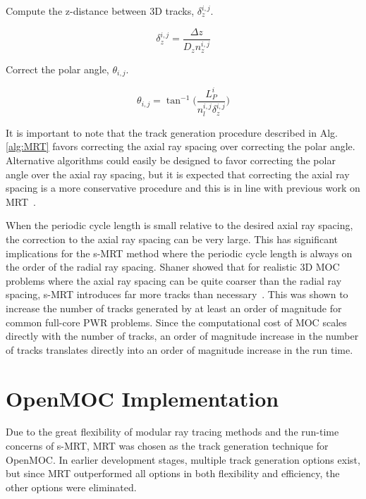 \begin{algorithm*}[!h]
\begin{algorithmic}
		\State Compute the z-distance between 3D tracks, $\delta_z^{i,j}$.
		
		\begin{equation}
		\delta_z^{i,j} = \frac{\Delta z}{D_z n_z^{i,j}}
		\nonumber
		\end{equation}
		
		\State Correct the polar angle, $\theta_{i,j}$.
		
		\begin{equation}
		\theta_{i,j} = \tan^{-1} \bigg( \frac{L_P^i}{n_l^{i,j} \delta_z^{i,j}}\bigg)
		\nonumber
		\end{equation}
		
		\EndFor
		\EndFor
	\end{algorithmic}
\end{algorithm*}

It is important to note that the track generation procedure described in Alg. \ref{alg:MRT} favors correcting the axial ray spacing over correcting the polar angle. Alternative algorithms could easily be designed to favor correcting the polar angle over the axial ray spacing, but it is expected that correcting the axial ray spacing is a more conservative procedure and this is in line with previous work on \ac{MRT}~\cite{kochunas}. 

When the periodic cycle length is small relative to the desired axial ray spacing, the correction to the axial ray spacing can be very large. This has significant implications for the \ac{s-MRT} method where the periodic cycle length is always on the order of the radial ray spacing. Shaner showed that for realistic 3D \ac{MOC} problems where the axial ray spacing can be quite coarser than the radial ray spacing, \ac{s-MRT} introduces far more tracks than necessary~\cite{shaner-laydown}. This was shown to increase the number of tracks generated by at least an order of magnitude for common full-core PWR problems. Since the computational cost of \ac{MOC} scales directly with the number of tracks, an order of magnitude increase in the number of tracks translates directly into an order of magnitude increase in the run time.

\section{OpenMOC Implementation}
\label{sec:openmoc-laydown}

Due to the great flexibility of modular ray tracing methods and the run-time concerns of \ac{s-MRT}, \ac{MRT} was chosen as the track generation technique for OpenMOC. In earlier development stages, multiple track generation options exist, but since \ac{MRT} outperformed all options in both flexibility and efficiency, the other options were eliminated.

